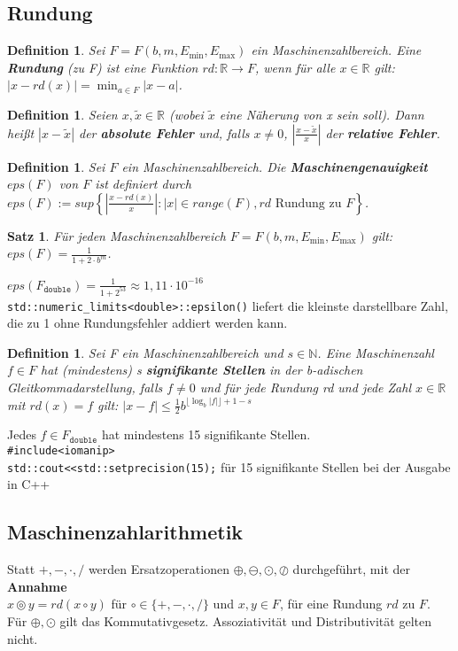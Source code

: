 \documentclass[12pt,a4paper]{article}
\theoremstyle{plain}
\newtheorem{Satz}[Theorem]{Satz}
\newtheorem{Definition}[Theorem]{Definition}
\newcommand{\herv}[1]{{\emph{\textbf{#1}}}}
\newcommand{\N}{\mathbb{N}}
\newcommand{\R}{\mathbb{R}}
\numberwithin{equation}{section}
\begin{document}
\subsection{Rundung}
\begin{Definition} Sei $F=F(b,m,E_{\text{min}},E_{\text{max}})$ ein Maschinenzahlbereich. Eine \herv{Rundung} (zu F) ist eine Funktion $rd: \R \rightarrow F$, wenn für alle $x \in \R$ gilt: $|x-rd(x)|=\min_{a\in F} |x-a|$.
\end{Definition}
\begin{Definition}
Seien $x, \tilde x \in \R$ (wobei $\tilde x$ eine Näherung von x sein soll). Dann heißt $|x-\tilde x|$ der \herv{absolute Fehler} und, falls $x\neq 0$, $\left|\frac{x-\tilde x}{x}\right|$ der \herv{relative Fehler}.
\end{Definition}
\begin{Definition} Sei $F$ ein Maschinenzahlbereich. Die \herv{Maschinengenauigkeit} $eps(F)$ von $F$ ist definiert durch $eps(F):=sup\left\lbrace \left|\frac{x-rd(x)}{x}\right|: |x|\in range(F), rd \text{ Rundung zu }F\right\rbrace$.
\end{Definition}
\begin{Satz}
Für jeden Maschinenzahlbereich $F=F(b,m,E_{\text{min}},E_{\text{max}})$ gilt: $eps(F)=\frac{1}{1+2\cdot b^m}$.
\end{Satz}
$eps(F_{\texttt{double}})=\frac{1}{1+2^{53}}\approx 1,11\cdot 10^{-16}$ \\
\texttt{std::numeric\_limits<double>::epsilon()} liefert die kleinste darstellbare Zahl, die zu 1 ohne Rundungsfehler addiert werden kann.
\begin{Definition}
Sei F ein Maschinenzahlbereich und $s\in \N$. Eine Maschinenzahl $f \in F$ hat (mindestens) s \herv{signifikante Stellen} in der b-adischen Gleitkommadarstellung, falls $f \neq 0$ und für jede Rundung rd und jede Zahl $x\in \R$ mit $rd(x)=f$ gilt: $\left| x- f \right|\leq \frac{1}{2} b^{\lfloor\log_b\left| f\right|\rfloor +1 -s }$
\end{Definition}
Jedes $f\in F_{\mathtt{double}}$ hat mindestens 15 signifikante Stellen.\\
\texttt{\#include<iomanip>}\\
\texttt{std::cout<<std::setprecision(15);} für 15 signifikante Stellen bei der Ausgabe in C++
\subsection{Maschinenzahlarithmetik}
Statt $+,-,\cdot,/$ werden Ersatzoperationen $\oplus,\ominus,\odot,\oslash$ durchgeführt, mit der \textbf{Annahme}\\
$x\circledcirc y=rd(x\circ y)$ für $\circ\in\{+,-,\cdot,/\}$ und $x,y\in F$, für eine Rundung $rd$ zu $F$.\\
Für $\oplus, \odot$ gilt das Kommutativgesetz. Assoziativität und Distributivität gelten nicht.
\end{document}
